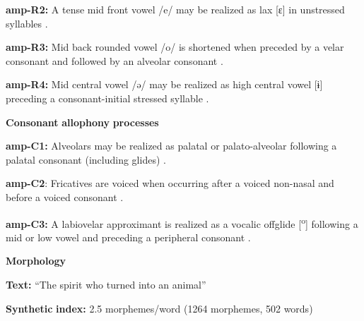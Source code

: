 \begin{styleBody}
\textbf{amp-R2:} A tense mid front vowel /e/ may be realized as lax [ɛ] in unstressed syllables \citep[38]{Bruce1984}.
\end{styleBody}

\begin{styleBody}
\textbf{amp-R3:} Mid back rounded vowel /o/ is shortened when preceded by a velar consonant and followed by an alveolar consonant \citep[39]{Bruce1984}.
\end{styleBody}

\begin{styleBody}
\textbf{amp-R4:} Mid central vowel /ə/ may be realized as high central vowel [ɨ] preceding a consonant-initial stressed syllable \citep[41]{Bruce1984}.
\end{styleBody}

\begin{styleBody}
\textbf{Consonant} \textbf{allophony} \textbf{processes}
\end{styleBody}

\begin{styleBody}
\textbf{amp-C1:} Alveolars may be realized as palatal or palato-alveolar following a palatal consonant (including glides) \citep[29]{Bruce1984}.
\end{styleBody}

\begin{styleBody}
\textbf{amp-C2}: Fricatives are voiced when occurring after a voiced non-nasal and before a voiced consonant \citep[25]{Bruce1984}.
\end{styleBody}

\begin{styleBody}
\textbf{amp-C3:} A labiovelar approximant is realized as a vocalic offglide [\textsuperscript{o}] following a mid or low vowel and preceding a peripheral consonant \citep[28]{Bruce1984}.
\end{styleBody}

\begin{styleBody}
\textbf{Morphology}
\end{styleBody}

\begin{styleBody}
\textbf{Text:} “The spirit who turned into an animal” \citep[323-331]{Bruce1984}
\end{styleBody}

\begin{styleBody}
\textbf{Synthetic} \textbf{index:} 2.5 morphemes/word (1264 morphemes, 502 words)
\end{styleBody}

